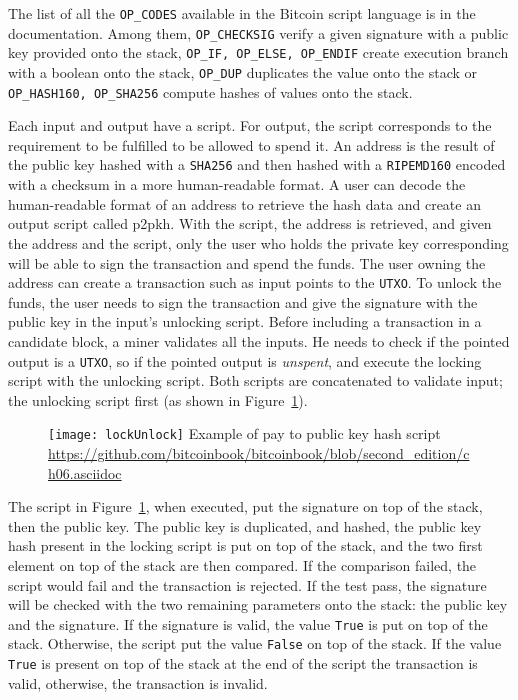 The list of all the \texttt{OP\_CODES} available in the Bitcoin script language
is in the documentation. Among them, \texttt{OP\_CHECKSIG} verify a given
signature with a public key provided onto the stack, \texttt{OP\_IF, OP\_ELSE,
OP\_ENDIF} create execution branch with a boolean onto the stack,
\texttt{OP\_DUP} duplicates the value onto the stack or \texttt{OP\_HASH160,
OP\_SHA256} compute hashes of values onto the stack.

Each input and output have a script. For output, the script corresponds to the
requirement to be fulfilled to be allowed to spend it. An address is the result
of the public key hashed with a \texttt{SHA256} and then hashed with a
\texttt{RIPEMD160} encoded with a checksum in a more human-readable format. A
user can decode the human-readable format of an address to retrieve the hash
data and create an output script called \gls{p2pkh}. With the script, the
address is retrieved, and given the address and the script, only the user who
holds the private key corresponding will be able to sign the transaction and
spend the funds. The user owning the address can create a transaction such as
input points to the \texttt{UTXO}. To unlock the funds, the user needs to sign
the transaction and give the signature with the public key in the input's
unlocking script. Before including a transaction in a candidate block, a miner
validates all the inputs. He needs to check if the pointed output is a
\texttt{UTXO}, so if the pointed output is \textit{unspent}, and execute the
locking script with the unlocking script. Both scripts are concatenated to
validate input; the unlocking script first (as shown in
Figure~\ref{fig:lockUnlock}).

\begin{figure}[H]
	\centering
	\texttt{[image: lockUnlock]}
  {Example of pay to public key hash script}
	{\url{https://github.com/bitcoinbook/bitcoinbook/blob/second_edition/ch06.asciidoc}}
	\label{fig:lockUnlock}
\end{figure}

The script in Figure~\ref{fig:lockUnlock}, when executed, put the signature on
top of the stack, then the public key. The public key is duplicated, and hashed,
the public key hash present in the locking script is put on top of the stack,
and the two first element on top of the stack are then compared. If the
comparison failed, the script would fail and the transaction is rejected. If the
test pass, the signature will be checked with the two remaining parameters onto
the stack: the public key and the signature. If the signature is valid, the
value \texttt{True} is put on top of the stack. Otherwise, the script put the
value \texttt{False} on top of the stack. If the value \texttt{True} is present
on top of the stack at the end of the script the transaction is valid,
otherwise, the transaction is invalid.

